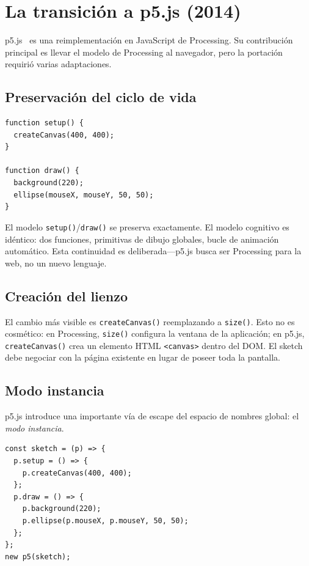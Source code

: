 \documentclass[10pt,letterpaper,twocolumn]{article}
\begin{document}

\section{La transición a p5.js (2014)}
\label{sec:p5js}

p5.js~\citep{mccarthy2015p5js} es una reimplementación en JavaScript de Processing. Su contribución principal es llevar el modelo de Processing al navegador, pero la portación requirió varias adaptaciones.

\subsection{Preservación del ciclo de vida}

\begin{lstlisting}[style=p5style,caption={Sketch mínimo de p5.js.}]
function setup() {
  createCanvas(400, 400);
}

function draw() {
  background(220);
  ellipse(mouseX, mouseY, 50, 50);
}
\end{lstlisting}

El modelo \texttt{setup()}/\texttt{draw()} se preserva exactamente. El modelo cognitivo es idéntico: dos funciones, primitivas de dibujo globales, bucle de animación automático. Esta continuidad es deliberada---p5.js busca ser Processing para la web, no un nuevo lenguaje.

\subsection{Creación del lienzo}

El cambio más visible es \texttt{createCanvas()} reemplazando a \texttt{size()}. Esto no es cosmético: en Processing, \texttt{size()} configura la ventana de la aplicación; en p5.js, \texttt{createCanvas()} crea un elemento HTML \texttt{<canvas>} dentro del DOM. El sketch debe negociar con la página existente en lugar de poseer toda la pantalla.

\subsection{Modo instancia}

p5.js introduce una importante vía de escape del espacio de nombres global: el \emph{modo instancia}.

\begin{lstlisting}[style=p5style,caption={Modo instancia de p5.js.}]
const sketch = (p) => {
  p.setup = () => {
    p.createCanvas(400, 400);
  };
  p.draw = () => {
    p.background(220);
    p.ellipse(p.mouseX, p.mouseY, 50, 50);
  };
};
new p5(sketch);
\end{lstlisting}
\end{document}
